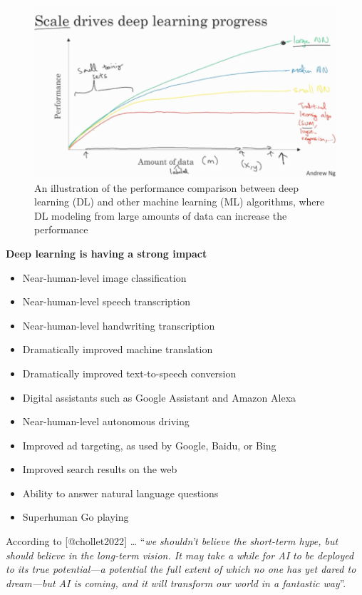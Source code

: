 \documentclass[
  letterpaper,
  DIV=11,
  numbers=noendperiod,
  oneside]{scrartcl}
\begin{document}
\begin{figure}

{\centering \includegraphics{images/PerformanceVsAmountOfData.png}

}

\caption{An illustration of the performance comparison between deep
learning (DL) and other machine learning (ML) algorithms, where DL
modeling from large amounts of data can increase the performance}

\end{figure}

\textbf{Deep learning is having a strong impact}

\begin{itemize}
\item
  Near-human-level image classification
\item
  Near-human-level speech transcription
\item
  Near-human-level handwriting transcription
\item
  Dramatically improved machine translation
\item
  Dramatically improved text-to-speech conversion
\item
  Digital assistants such as Google Assistant and Amazon Alexa
\item
  Near-human-level autonomous driving
\item
  Improved ad targeting, as used by Google, Baidu, or Bing
\item
  Improved search results on the web
\item
  Ability to answer natural language questions
\item
  Superhuman Go playing
\end{itemize}

According to {[}@chollet2022{]} \ldots{} ``\emph{we shouldn't believe
the short-term hype, but should believe in the long-term vision. It may
take a while for AI to be deployed to its true potential---a potential
the full extent of which no one has yet dared to dream---but AI is
coming, and it will transform our world in a fantastic way}''.
\end{document}
